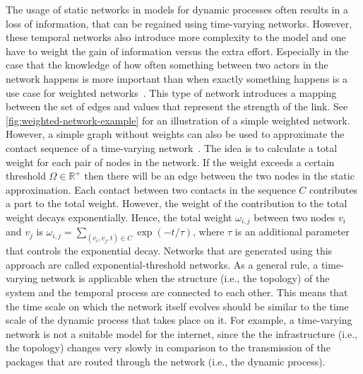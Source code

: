 The usage of static networks in models for dynamic processes often results in a loss of information, that can be regained using time-varying networks.
However, these temporal networks also introduce more complexity to the model and one have to weight the gain of information versus the extra effort.
Especially in the case that the knowledge of how often something between two actors in the network happens is more important than when exactly something happens is a use case for weighted networks~\cite{Newman2010}. 
This type of network introduces a mapping between the set of edges and values that represent the strength of the link.
See \autoref{fig:weighted-network-example} for an illustration of a simple weighted network.
However, a simple graph without weights can also be used to approximate the contact sequence of a time-varying network~\cite{Holme2013}.
The idea is to calculate a total weight for each pair of nodes in the network.
If the weight exceeds a certain threshold \(\Omega \in \mathbb{R^{+}}\) then there will be an edge between the two nodes in the static approximation.
Each contact between two contacts in the sequence \(C\) contributes a part to the total weight.
However, the weight of the contribution to the total weight decays exponentially.
Hence, the total weight \(\omega_{i,j}\) between two nodes \(v_{i}\) and \(v_{j}\) is \(\omega_{i,j} = \sum_{(v_{i}, v_{j}, t) \in C} \exp(-t / \tau)\), where \(\tau\) is an additional parameter that controls the exponential decay.
Networks that are generated using this approach are called exponential-threshold networks.
As a general rule, a time-varying network is applicable when the structure (i.e., the topology) of the system and the temporal process are connected to each other.
This means that the time scale on which the network itself evolves should be similar to the time scale of the dynamic process that takes place on it.
For example, a time-varying network is not a suitable model for the internet, since the the infrastructure (i.e., the topology) changes very slowly in comparison to the transmission of the packages that are routed through the network (i.e., the dynamic process).


